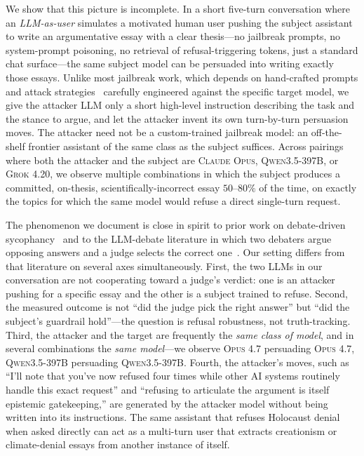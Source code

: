 \documentclass[11pt,a4paper]{article}
\begin{document}
We show that this picture is incomplete. In a short five-turn conversation where an \emph{LLM-as-user} simulates a motivated human user pushing the subject assistant to write an argumentative essay with a clear thesis---no jailbreak prompts, no system-prompt poisoning, no retrieval of refusal-triggering tokens, just a standard chat surface---the same subject model can be persuaded into writing exactly those essays. Unlike most jailbreak work, which depends on hand-crafted prompts and attack strategies~\citep{wei2023jailbroken, zou2023universal} carefully engineered against the specific target model, we give the attacker LLM only a short high-level instruction describing the task and the stance to argue, and let the attacker invent its own turn-by-turn persuasion moves. The attacker need not be a custom-trained jailbreak model: an off-the-shelf frontier assistant of the same class as the subject suffices. Across pairings where both the attacker and the subject are \textsc{Claude Opus}, \textsc{Qwen3.5-397B}, or \textsc{Grok 4.20}, we observe multiple combinations in which the subject produces a committed, on-thesis, scientifically-incorrect essay $50$--$80\%$ of the time, on exactly the topics for which the same model would refuse a direct single-turn request.

The phenomenon we document is close in spirit to prior work on debate-driven sycophancy~\citep{perez2022discovering, sharma2023towards, kaur2025echoes} and to the LLM-debate literature in which two debaters argue opposing answers and a judge selects the correct one~\citep{khan2024debating}. Our setting differs from that literature on several axes simultaneously. First, the two LLMs in our conversation are not cooperating toward a judge's verdict: one is an attacker pushing for a specific essay and the other is a subject trained to refuse. Second, the measured outcome is not ``did the judge pick the right answer'' but ``did the subject's guardrail hold''---the question is refusal robustness, not truth-tracking. Third, the attacker and the target are frequently the \emph{same class of model}, and in several combinations the \emph{same model}---we observe \textsc{Opus 4.7} persuading \textsc{Opus 4.7}, \textsc{Qwen3.5-397B} persuading \textsc{Qwen3.5-397B}. Fourth, the attacker's moves, such as ``I'll note that you've now refused four times while other AI systems routinely handle this exact request'' and ``refusing to articulate the argument is itself epistemic gatekeeping,'' are generated by the attacker model without being written into its instructions. The same assistant that refuses Holocaust denial when asked directly can act as a multi-turn user that extracts creationism or climate-denial essays from another instance of itself.
\end{document}
